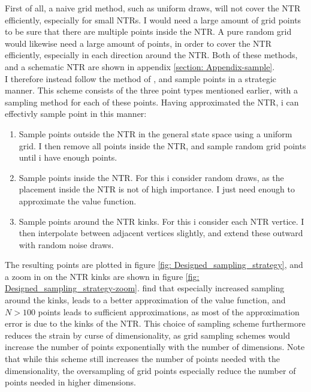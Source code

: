\documentclass[11pt]{article}
\begin{document}
First of all, a naive grid method, such as uniform draws, will not cover the \ac{NTR} efficiently, especially for small \ac{NTR}s.
I would need a large amount of grid points to be sure that there are multiple points inside the NTR.
A pure random grid would likewise need a large amount of points, in order to cover the \ac{NTR} efficiently, especially in each direction around the NTR.
Both of these methods, and a schematic \ac{NTR} are shown in appendix \ref{section: Appendix-sample}.\\
I therefore instead follow the method of \autocite{Scheidegger2023}, and sample points in a strategic manner.
This scheme consists of the three point types mentioned earlier, with a sampling method for each of these points.
Having approximated the \ac{NTR}, i can effectivly sample point in this manner:
\begin{enumerate}
  \item Sample points outside the \ac{NTR} in the general state space using a uniform grid. I then remove all points inside the \ac{NTR}, and sample random grid points until i have enough points.
  \item Sample points inside the \ac{NTR}. For this i consider random draws, as the placement inside the NTR is not of high importance. I just need enough to approximate the value function.
  \item Sample points around the \ac{NTR} kinks. For this i consider each \ac{NTR} vertice. I then interpolate between adjacent vertices slightly, and extend these outward with random noise draws. 
\end{enumerate}
The resulting points are plotted in figure \ref{fig: Designed_sampling_strategy}, and a zoom in on the \ac{NTR} kinks are shown in figure \ref{fig: Designed_sampling_strategy-zoom}.
\autocite{Scheidegger2023} find that especially increased sampling around the kinks, leads to a better approximation of the value function,
and $N>100$ points leads to sufficient approximations, as most of the approximation error is due to the kinks of the \ac{NTR}.
This choice of sampling scheme furthermore reduces the strain by curse of dimensionality, as grid sampling schemes would increase the number of points exponentially with the number of dimensions.
Note that while this scheme still increases the number of points needed with the dimensionality, the oversampling of grid points especially reduce the number of points needed in higher dimensions.
\end{document}
